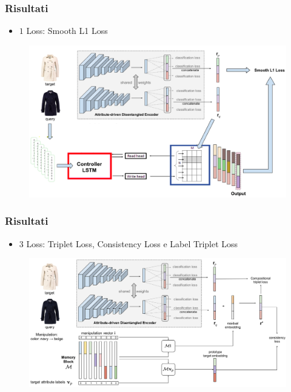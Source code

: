 \documentclass{beamer}
\begin{document}
\begin{frame}
\frametitle{Risultati}
\begin{itemize} 
\item $1$ Loss: Smooth L1 Loss
\end{itemize}
\begin{figure}[!h]
 			\begin{center}
 			\includegraphics[scale=0.3]{"Immagini/All2.png"}
 			\end{center}
\end{figure}
\end{frame}

\begin{frame}
\frametitle{Risultati}
\begin{itemize} 
\item $3$ Loss: Triplet Loss, Consistency Loss e Label Triplet Loss
\end{itemize}
\begin{figure}[!h]
 			\begin{center}
 			\includegraphics[scale=0.29]{"Immagini/ADDE-M.png"}
 			\end{center}
\end{figure}
\end{frame}
\end{document}
